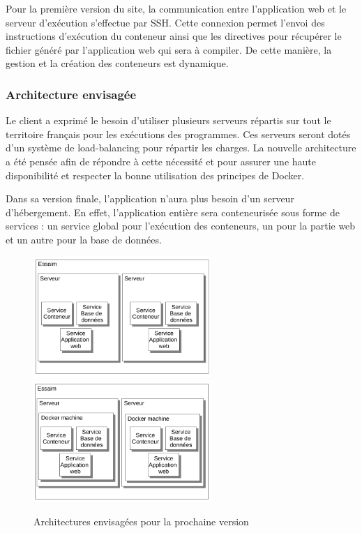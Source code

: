 \par Pour la première version du site, la communication entre l’application web et le serveur d'exécution s’effectue par SSH. Cette connexion permet l'envoi des instructions d'exécution du conteneur ainsi que les directives pour récupérer le fichier généré par l’application web qui sera à compiler. De cette manière, la gestion et la création des conteneurs est dynamique.

\subsubsection{Architecture envisagée}

\par Le client a exprimé le besoin d'utiliser plusieurs serveurs répartis sur tout le territoire français pour les exécutions des programmes. Ces serveurs seront dotés d'un système de load-balancing pour répartir les charges.
La nouvelle architecture a été pensée afin de répondre à cette nécessité et pour assurer une haute disponibilité et respecter la bonne utilisation des principes de Docker.

\par Dans sa version finale, l’application n’aura plus besoin d’un serveur d’hébergement. En effet, l’application entière sera conteneurisée sous forme de services : un service global pour l’exécution des conteneurs, un pour la partie web et un autre pour la base de données.

\begin{figure}[H]
\centering
\includegraphics[width=0.6\textwidth]{./img/backend/architectureenvisagee1.png}
\includegraphics[width=0.6\textwidth]{./img/backend/architectureenvisagee2.png}
\caption{Architectures envisagées pour la prochaine version}
\end{figure}

